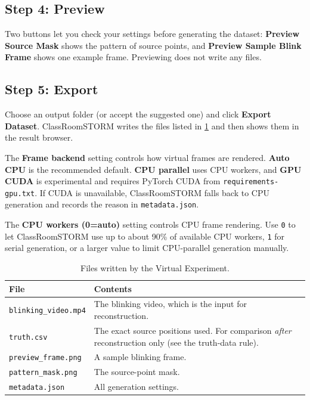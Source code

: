 \documentclass[11pt,a4paper]{article}
\newcommand{\ui}[1]{\textbf{#1}}
\newcommand{\file}[1]{\texttt{#1}}
\newcommand{\app}{ClassRoomSTORM}
\begin{document}
\subsection{Step 4: Preview}
\label{sec:ve-preview}

Two buttons let you check your settings before generating the dataset:
\ui{Preview Source Mask} shows the pattern of source points, and \ui{Preview
Sample Blink Frame} shows one example frame. Previewing does not write any files.

\subsection{Step 5: Export}
\label{sec:ve-export}

Choose an output folder (or accept the suggested one) and click
\ui{Export Dataset}. \app{} writes the files listed in \cref{tab:ve-outputs}
and then shows them in the result browser.

The \ui{Frame backend} setting controls how virtual frames are rendered.
\ui{Auto CPU} is the recommended default. \ui{CPU parallel} uses CPU workers,
and \ui{GPU CUDA} is experimental and requires PyTorch CUDA from
\file{requirements-gpu.txt}. If CUDA is unavailable, \app{} falls back to CPU
generation and records the reason in \file{metadata.json}.

The \ui{CPU workers (0=auto)} setting controls CPU frame rendering. Use
\texttt{0} to let \app{} use up to about 90\% of available CPU workers,
\texttt{1} for serial generation, or a larger value to limit CPU-parallel
generation manually.

\begin{table}[htbp]
\centering\small
\begin{tabularx}{\linewidth}{@{}lX@{}}
\toprule
\textbf{File} & \textbf{Contents}\\
\midrule
\file{blinking\_video.mp4} & The blinking video, which is the input for reconstruction.\\
\file{truth.csv} & The exact source positions used. For comparison
  \emph{after} reconstruction only (see the truth-data rule).\\
\file{preview\_frame.png} & A sample blinking frame.\\
\file{pattern\_mask.png} & The source-point mask.\\
\file{metadata.json} & All generation settings.\\
\bottomrule
\end{tabularx}
\caption{Files written by the Virtual Experiment.}
\label{tab:ve-outputs}
\end{table}
\end{document}

